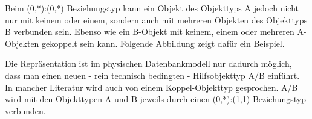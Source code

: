         Beim (0,*):(0,*) Beziehungstyp kann ein Objekt des Objekttyps A jedoch nicht nur mit keinem oder einem, sondern auch mit mehreren Objekten des Objekttyps B verbunden sein. Ebenso wie ein B-Objekt mit keinem, einem oder mehreren A-Objekten gekoppelt sein kann. Folgende Abbildung zeigt daf\"ur ein Beispiel.
        \begin{center}
        \end{center}
        Die Repr\"asentation ist im physischen Datenbankmodell nur dadurch m\"oglich, dass man einen neuen - rein technisch bedingten - Hilfsobjekttyp A/B einf\"uhrt. In mancher Literatur wird auch von einem Koppel-Objekttyp gesprochen. A/B wird mit den Objekttypen A und B jeweils durch einen (0,*):(1,1) Beziehungstyp verbunden.
